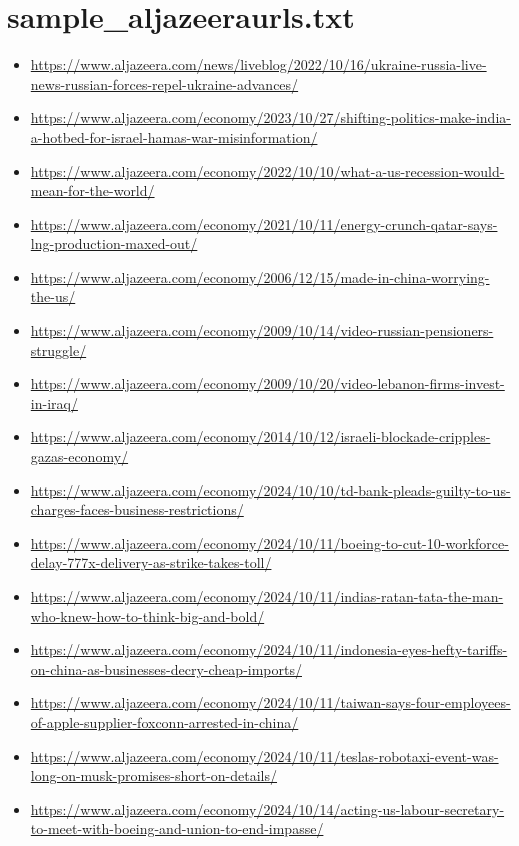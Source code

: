 \section{sample\_aljazeeraurls.txt}
\begin{itemize}
    \item \url{https://www.aljazeera.com/news/liveblog/2022/10/16/ukraine-russia-live-news-russian-forces-repel-ukraine-advances/}
    \item \url{https://www.aljazeera.com/economy/2023/10/27/shifting-politics-make-india-a-hotbed-for-israel-hamas-war-misinformation/}
    \item \url{https://www.aljazeera.com/economy/2022/10/10/what-a-us-recession-would-mean-for-the-world/}
    \item \url{https://www.aljazeera.com/economy/2021/10/11/energy-crunch-qatar-says-lng-production-maxed-out/}
    \item \url{https://www.aljazeera.com/economy/2006/12/15/made-in-china-worrying-the-us/}
    \item \url{https://www.aljazeera.com/economy/2009/10/14/video-russian-pensioners-struggle/}
    \item \url{https://www.aljazeera.com/economy/2009/10/20/video-lebanon-firms-invest-in-iraq/}
    \item \url{https://www.aljazeera.com/economy/2014/10/12/israeli-blockade-cripples-gazas-economy/}
    \item \url{https://www.aljazeera.com/economy/2024/10/10/td-bank-pleads-guilty-to-us-charges-faces-business-restrictions/}
    \item \url{https://www.aljazeera.com/economy/2024/10/11/boeing-to-cut-10-workforce-delay-777x-delivery-as-strike-takes-toll/}
    \item \url{https://www.aljazeera.com/economy/2024/10/11/indias-ratan-tata-the-man-who-knew-how-to-think-big-and-bold/}
    \item \url{https://www.aljazeera.com/economy/2024/10/11/indonesia-eyes-hefty-tariffs-on-china-as-businesses-decry-cheap-imports/}
    \item \url{https://www.aljazeera.com/economy/2024/10/11/taiwan-says-four-employees-of-apple-supplier-foxconn-arrested-in-china/}
    \item \url{https://www.aljazeera.com/economy/2024/10/11/teslas-robotaxi-event-was-long-on-musk-promises-short-on-details/}
    \item \url{https://www.aljazeera.com/economy/2024/10/14/acting-us-labour-secretary-to-meet-with-boeing-and-union-to-end-impasse/}

\end{itemize}
